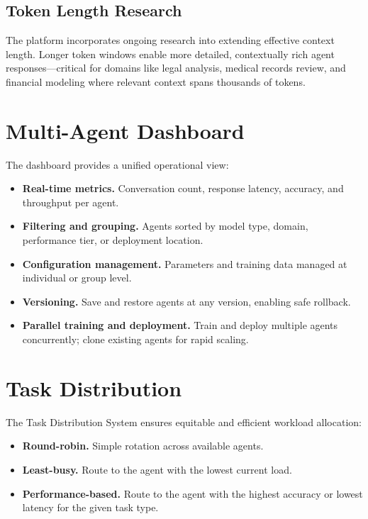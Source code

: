 \documentclass[11pt,twocolumn]{article}
\begin{document}
\subsection{Token Length Research}

The platform incorporates ongoing research into extending effective context
length. Longer token windows enable more detailed, contextually rich agent
responses---critical for domains like legal analysis, medical records review, and
financial modeling where relevant context spans thousands of tokens.

\section{Multi-Agent Dashboard}
\label{sec:dashboard}

The dashboard provides a unified operational view:

\begin{itemize}[leftmargin=1.1em]
    \item \textbf{Real-time metrics.} Conversation count, response latency,
    accuracy, and throughput per agent.
    \item \textbf{Filtering and grouping.} Agents sorted by model type, domain,
    performance tier, or deployment location.
    \item \textbf{Configuration management.} Parameters and training data managed
    at individual or group level.
    \item \textbf{Versioning.} Save and restore agents at any version, enabling
    safe rollback.
    \item \textbf{Parallel training and deployment.} Train and deploy multiple
    agents concurrently; clone existing agents for rapid scaling.
\end{itemize}

\section{Task Distribution}
\label{sec:tasks}

The Task Distribution System ensures equitable and efficient workload allocation:

\begin{itemize}[leftmargin=1.1em]
    \item \textbf{Round-robin.} Simple rotation across available agents.
    \item \textbf{Least-busy.} Route to the agent with the lowest current load.
    \item \textbf{Performance-based.} Route to the agent with the highest
    accuracy or lowest latency for the given task type.
\end{itemize}
\end{document}
